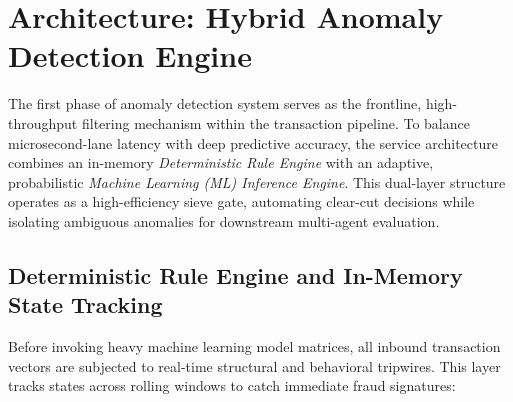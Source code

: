 \documentclass[12pt]{report}
\begin{document}
\section{Architecture: Hybrid Anomaly Detection Engine}
The first phase of anomaly detection system serves as the frontline, high-throughput filtering mechanism within the transaction pipeline. To balance microsecond-lane latency with deep predictive accuracy, the service architecture combines an in-memory \textit{Deterministic Rule Engine} with an adaptive, probabilistic \textit{Machine Learning (ML) Inference Engine}. This dual-layer structure operates as a high-efficiency sieve gate, automating clear-cut decisions while isolating ambiguous anomalies for downstream multi-agent evaluation.

\subsection{Deterministic Rule Engine and In-Memory State Tracking}
Before invoking heavy machine learning model matrices, all inbound transaction vectors are subjected to real-time structural and behavioral tripwires. This layer tracks states across rolling windows to catch immediate fraud signatures:
\end{document}
